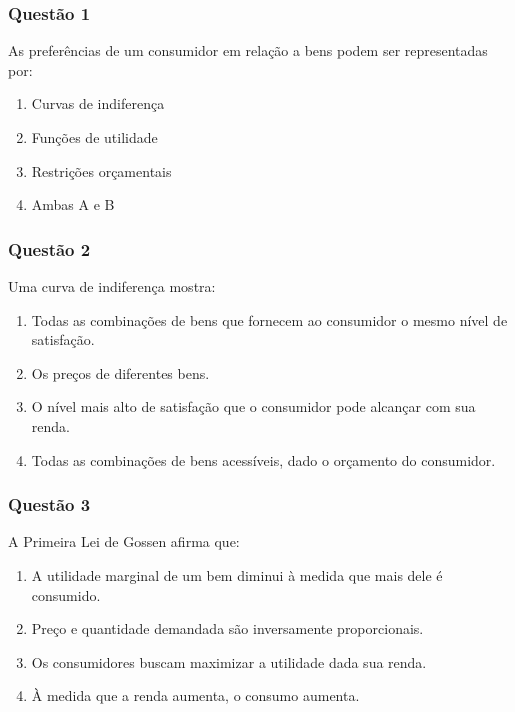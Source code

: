 \begin{frame}
    \frametitle{Questão 1}
    
    As preferências de um consumidor em relação a bens podem ser representadas por:

    \begin{enumerate}
           
    \item Curvas de indiferença 
    \item Funções de utilidade 
    \item Restrições orçamentais 
    \item Ambas A e B

    \end{enumerate}
\end{frame}
    
\begin{frame}
    \frametitle{Questão 2}
    
    Uma curva de indiferença mostra:
    
    \begin{enumerate}
    
    \item Todas as combinações de bens que fornecem ao consumidor o mesmo nível de satisfação. 
    \item Os preços de diferentes bens. 
    \item O nível mais alto de satisfação que o consumidor pode alcançar com sua renda. 
    \item Todas as combinações de bens acessíveis, dado o orçamento do consumidor.

    \end{enumerate}
\end{frame}
    
\begin{frame}
    \frametitle{Questão 3}
    
    A Primeira Lei de Gossen afirma que:
    \begin{enumerate}
    
    \item A utilidade marginal de um bem diminui à medida que mais dele é consumido. 
    \item Preço e quantidade demandada são inversamente proporcionais. 
    \item Os consumidores buscam maximizar a utilidade dada sua renda. 
    \item À medida que a renda aumenta, o consumo aumenta.
\end{enumerate}
\end{frame}
    
